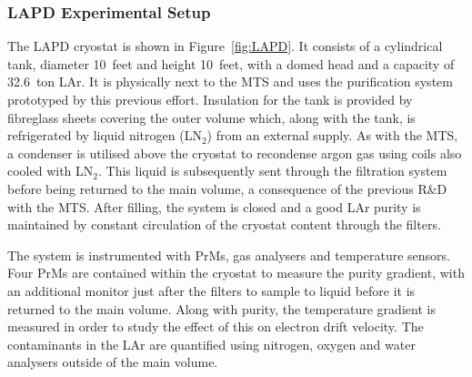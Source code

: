 \subsubsection{LAPD Experimental Setup}\label{sec:LAPDExperimentalSetup}

The LAPD cryostat is shown in Figure~\ref{fig:LAPD}.  It consists of a cylindrical tank, diameter 10~feet and height 10~feet, with a domed head and a capacity of 32.6~ton LAr.  It is physically next to the MTS and uses the purification system prototyped by this previous effort.  Insulation for the tank is provided by fibreglass sheets covering the outer volume which, along with the tank, is refrigerated by liquid nitrogen (LN$_2$) from an external supply.  As with the MTS, a condenser is utilised above the cryostat to recondense argon gas using coils also cooled with LN$_2$.  This liquid is subsequently sent through the filtration system before being returned to the main volume, a consequence of the previous R\&D with the MTS.  After filling, the system is closed and a good LAr purity is maintained by constant circulation of the cryostat content through the filters.

The system is instrumented with PrMs, gas analysers and temperature sensors.  Four PrMs are contained within the cryostat to measure the purity gradient, with an additional monitor just after the filters to sample to liquid before it is returned to the main volume.  Along with purity, the temperature gradient is measured in order to study the effect of this on electron drift velocity.  The contaminants in the LAr are quantified using nitrogen, oxygen and water analysers outside of the main volume.

